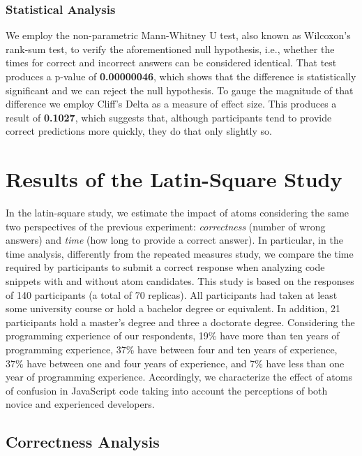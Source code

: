 \subsubsection*{Statistical Analysis}

We employ the non-parametric Mann-Whitney U test, also known as Wilcoxon's rank-sum test, to verify the aforementioned null hypothesis, i.e., whether the times for correct and incorrect answers can be considered identical. That test produces a p-value of \textbf{0.00000046}, which shows that the difference is statistically significant and we can reject the null hypothesis. To gauge the magnitude of that difference we employ Cliff's Delta as a measure of effect size. This produces a result of \textbf{0.1027}, which suggests that, although participants tend to provide correct predictions more quickly, they do that only slightly so. 

\section{Results of the Latin-Square Study}\label{sec:latin}

In the latin-square study, we estimate the impact of atoms considering the same two perspectives of the previous experiment: \emph{correctness} (number of wrong answers)
and \emph{time} (how long to provide a correct answer). In particular, in the time analysis, differently from the repeated  measures study, we compare the time required by participants to submit a correct response when analyzing code snippets with and without atom candidates. This study is based on the responses of 140 participants (a total of 70 replicas). All participants had taken at least some university course or hold a bachelor degree or equivalent. In addition, 21 participants hold a master's degree and three a doctorate degree. Considering the programming experience of our respondents, 19\% have more than ten years of programming experience, 37\% have between four and ten years of experience, 37\% have between one and four years of experience, and 7\% have less than one year of programming experience.  
Accordingly, we characterize the effect of atoms of confusion in JavaScript code taking into account the perceptions of both novice and experienced developers. 

\subsection{Correctness Analysis}

